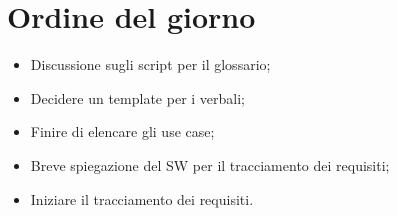 \documentclass[../template.tex]{subfiles}
\begin{document}
\section{Ordine del giorno}
\begin{itemize}
	\item Discussione sugli script per il glossario;
	\item Decidere un template per i verbali;
	\item Finire di elencare gli use case;
	\item Breve spiegazione del SW per il tracciamento dei requisiti;
	\item Iniziare il tracciamento dei requisiti.
\end{itemize}
\end{document}
